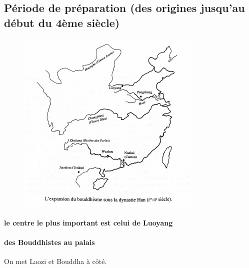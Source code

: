 \subsection{Période de préparation (des origines jusqu’au début du 4ème siècle)}



\begin{figure}[!h]
    \centering
    \includegraphics[width=0.8\textwidth]{ConfucianismeTaoismeBouddhismeChinois/Images/BouddhismeHan.jpg}

    \label{fig:enter-label}
\end{figure}

\paragraph{le centre le plus important est celui de Luoyang}
\paragraph{des Bouddhistes au palais} On met Laozi et Bouddha à côté. 
 


